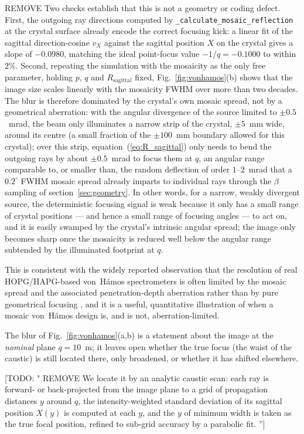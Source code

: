 \documentclass{iucr}
\newcommand{\todo}[1]{{\color{red}[TODO: "#1'']}}
\newcommand{\inred}[1]{{\color{red}#1}}
\begin{document}
\inred{REMOVE Two checks establish that
this is not a geometry or coding defect. First, the outgoing ray directions
computed by \texttt{\_calculate\_mosaic\_reflection} at the crystal surface
already encode the correct focusing kick: a linear fit of the sagittal
direction-cosine $v_X$ against the sagittal position $X$ on the crystal gives a
slope of $-0.0980$, matching the ideal point-focus value $-1/q = -0.1000$ to
within $2\%$. Second, repeating the simulation with the mosaicity as the only
free parameter, holding $p$, $q$ and $R_\mathrm{sagittal}$ fixed,
Fig.~\ref{fig:vonhamos}(b) shows that the image size scales linearly with the
mosaicity FWHM over more than two decades. The blur is therefore dominated by
the crystal's own mosaic spread, not by a geometrical aberration: with the
angular divergence of the source limited to $\pm 0.5$~mrad, the beam only
illuminates a narrow strip of the crystal, $\pm 5$~mm wide, around its centre
(a small fraction of the $\pm 100$~mm boundary allowed for this crystal); over
this strip, equation~(\ref{eq:R_sagittal}) only needs to bend the outgoing rays
by about $\pm 0.5$~mrad to focus them at $q$, an angular range comparable to,
or smaller than, the random deflection of order $1$--$2$~mrad that a
$0.2^\circ$ FWHM mosaic spread already imparts to individual rays through the
$\beta$ sampling of section~\ref{sec:geometry}. In other words, for a narrow,
weakly divergent source, the deterministic focusing signal is weak because it
only has a small range of crystal positions --- and hence a small range of
focusing angles --- to act on, and it is easily swamped by the crystal's
intrinsic angular spread; the image only becomes sharp once the mosaicity is
reduced well below the angular range subtended by the illuminated footprint at
$q$. }


This is consistent with the widely reported observation that the
resolution of real HOPG/HAPG-based von~H\'amos spectrometers is often limited
by the mosaic spread and the associated penetration-depth aberration rather
than by pure geometrical focusing \cite{Zastrau2012, Zastrau2013}, and it is a
useful, quantitative illustration of when a mosaic von~H\'amos design is, and
is not, aberration-limited.

The blur of Fig.~\ref{fig:vonhamos}(a,b) is a statement about the image at the
\emph{nominal} plane $q=10$~m; it leaves open whether the true focus (the
waist of the caustic) is still located there, only broadened, or whether it
has shifted elsewhere. 

\todo{ REMOVE We locate it by an analytic caustic scan: each ray is
forward- or back-projected from the image plane to a grid of propagation
distances $y$ around $q$, the intensity-weighted standard deviation of its
sagittal position $X(y)$ is computed at each $y$, and the $y$ of minimum
width is taken as the true focal position, refined to sub-grid accuracy by a
parabolic fit. }
\end{document}
